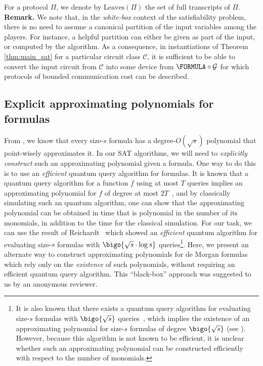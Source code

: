 	For a protocol $\Pi$, we denote by $\mathrm{Leaves}(\Pi)$ the set of full transcripts of $\Pi$.\\
	
	\noindent \textbf{Remark.} We note that, in the \emph{white-box} context of the satisfiability problem, there is no need to assume a canonical partition of the input variables among the  players. For instance, a helpful partition can either be given as part of the input, or computed by the algorithm. As a consequence, in instantiations of Theorem \ref{thm:main_sat} for a particular circuit class $\mathcal{C}$, it is sufficient to be able to convert the input circuit from $\mathcal{C}$ into some device from $\FORMULA \circ \mathcal{G}$ for which protocols of bounded communication cost can be described.
	
%
%
%
%
%
%
%
	
%
%
	    
%
%

    \subsection{Explicit approximating polynomials for formulas}
    
    From , we know that every size-$s$ formula has a degree-$O(\sqrt{s})$ polynomial that point-wisely approximates it. In our SAT algorithms, we will need to \emph{explicitly construct} such an approximating polynomial given a formula. One way to do this is to use an \emph{efficient} quantum query algorithm for formulas. It is known that a quantum query algorithm for a function $f$ using at most $T$ queries implies an approximating polynomial for $f$ of degree at most $2T$~\cite{BBC+01}, and by classically simulating such an quantum algorithm, one can show that the approximating polynomial can be obtained in time that is polynomial in the number of its monomials, in addition to the time for the classical simulation. For our task, we can use the result of Reichardt~\cite{Rei11a} which showed an \emph{efficient} quantum algorithm for evaluating size-$s$ formulas with $\bigo{\sqrt{s}\cdot \log s}$ queries\footnote{It is also known that there exists a quantum query algorithm for evaluating size-$s$ formulas with $\bigo{\sqrt{s}}$ queries~\cite{Rei11b}, which implies the existence of an approximating polynomial for size-$s$ formulas of degree $\bigo{\sqrt{s}}$ (see ). However, because this algorithm is not known to be efficient, it is unclear whether such an approximating polynomial can be constructed efficiently with respect to the number of monomials.}. Here, we present an alternate way to construct approximating polynomials for de Morgan formulas which rely only on the \emph{existence} of such polynomials, without requiring an efficient quantum query algorithm. This ``black-box'' approach was suggested to us by an anonymous reviewer.
    
